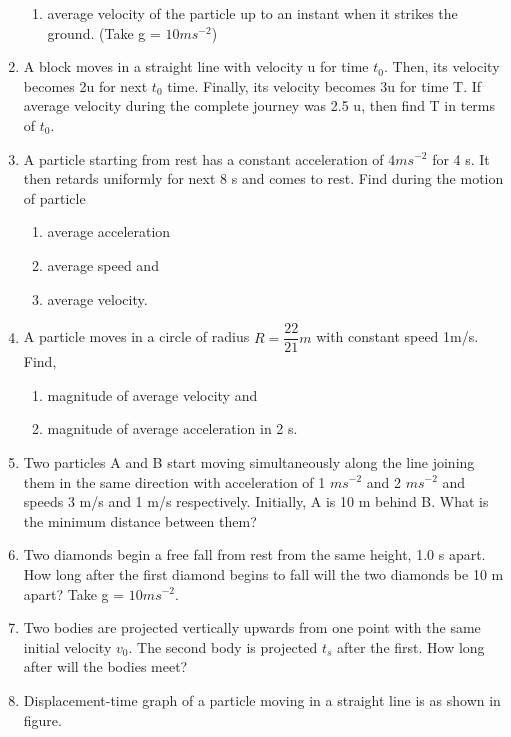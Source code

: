 \documentclass{article}
\renewcommand{\frac}[2]{\dfrac{#1}{#2}}
\begin{document}
\begin{enumerate}
\begin{enumerate}
        \item average velocity of the particle up to an instant when it strikes the ground. (Take g = $10 ms^{-2}$)
    \end{enumerate}
    \item A block moves in a straight line with velocity u for time $t_0$. Then, its velocity becomes 2u for next $t_0$ time. Finally, its velocity becomes 3u for time T. If average velocity during the complete journey was 2.5 u, then find T in terms of $t_0$.
    \item A particle starting from rest has a constant acceleration of $4 ms^{-2}$ for 4 s. It then retards uniformly for next 8 s and comes to rest. Find during the motion of particle 
    \begin{enumerate}
        \item average acceleration
        \item average speed and 
        \item average velocity.
    \end{enumerate}
    \item A particle moves in a circle of radius $R = \frac{22}{21} m$ with constant speed 1m/s. Find,
    \begin{enumerate}
        \item magnitude of average velocity and 
        \item magnitude of average acceleration in 2 s.
    \end{enumerate}
    \item Two particles A and B start moving simultaneously along the line joining them in the same direction with acceleration of 1 $ms^{-2}$ and 2 $ms^{-2}$ and speeds 3 m/s and 1 m/s respectively. Initially, A is 10 m behind B. What is the minimum distance between them?
    \item Two diamonds begin a free fall from rest from the same height, 1.0 s apart. How long after the first diamond begins to fall will the two diamonds be 10 m apart? Take g = $10 ms^{-2}$.
    \item Two bodies are projected vertically upwards from one point with the same initial velocity $v_0$. The second body is projected $t_s$ after the first. How long after will the bodies meet?
    \item Displacement-time graph of a particle moving in a straight line is as shown in figure.
    \begin{center}
    \end{center}
    

\end{enumerate}
\end{document}
